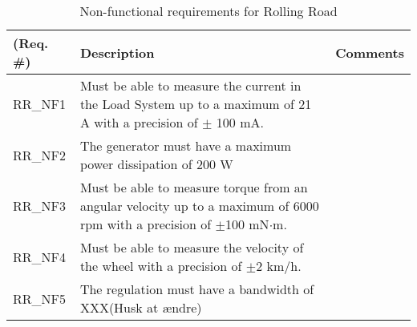 \begin{table}[h!]
	\centering
	\begin{tabular}{|p{2 cm}|p{7 cm}|p{4 cm}|}
		\hline
		\textbf{(Req. \#)} & \textbf{Description} & \textbf{Comments} \\\hline
		RR\_NF1	& Must be able to measure the current in the Load System up to a maximum of 21 A with a precision of $\pm$ 100 mA. &   \\\hline
		RR\_NF2	& The generator must have a maximum power dissipation of 200 W &   \\\hline
		RR\_NF3	& Must be able to measure torque from an angular velocity up to a maximum of 6000 rpm with a precision of $\pm$100 mN$\cdot$m.  &   \\\hline
		RR\_NF4	& Must be able to measure the velocity of the wheel with a precision of $\pm$2 km/h. &   \\\hline
		RR\_NF5	& The regulation must have a bandwidth of XXX\fxnote (Husk at ændre) &   \\\hline
	\end{tabular}
	\label{Nonfunctional:RollingRoad}
	\caption{Non-functional requirements for Rolling Road}
\end{table}